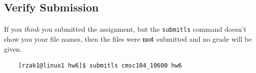 \documentclass[letter,11pt]{article}
\begin{document}
\subsection*{Verify Submission}
\paragraph{}If you \textit{think} you submitted the assignment, but the \texttt{submitls} command doesn't show you your file names, then the files were \textbf{not} submitted and no grade will be given.
\begin{verbatim}
    [rzak1@linux1 hw6]$ submitls cmsc104_10600 hw6
\end{verbatim}
\end{document}

